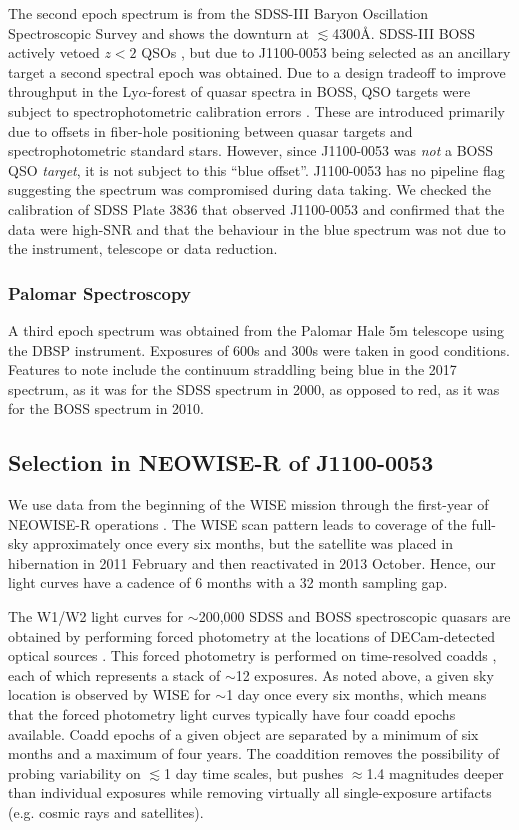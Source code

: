 \documentclass[11pt,a4paper]{article}
\begin{document}
The second epoch spectrum is from the SDSS-III Baryon Oscillation
Spectroscopic Survey \citep[BOSS; ][]{Dawson2013} and shows the
downturn at $\lesssim$4300\AA. SDSS-III BOSS actively vetoed $z<2$
QSOs \citep{Ross2012}, but due to J1100-0053 being selected as an
ancillary target \citep[via a white dwarf program;][]{Kepler2015,
Kepler2016} a second spectral epoch was obtained. Due to a design
tradeoff to improve throughput in the Ly$\alpha$-forest of quasar
spectra in BOSS, QSO targets were subject to spectrophotometric
calibration errors \citep{Margala2016}. These are introduced primarily
due to offsets in fiber-hole positioning between quasar targets and
spectrophotometric standard stars. However, since J1100-0053 was {\it
not} a BOSS QSO {\it target}, it is not subject to this ``blue
offset''. J1100-0053 has no pipeline flag suggesting the spectrum was
compromised during data taking. We checked the calibration of SDSS
Plate 3836 that observed J1100-0053 and confirmed that the data were
high-SNR and that the behaviour in the blue spectrum was not due to
the instrument, telescope or data reduction.


\subsubsection{Palomar Spectroscopy} 
A third epoch spectrum was obtained from the Palomar Hale 5m telescope
using the DBSP instrument.  Exposures of 600s and 300s were taken in
good conditions. Features to note include the continuum straddling
\mgii being blue in the 2017 spectrum, as it was for the SDSS spectrum
in 2000, as opposed to red, as it was for the BOSS spectrum in 2010.


\subsection{Selection in NEOWISE-R of J1100-0053}
We use data from the beginning of the WISE mission \citep[2010
January; ][]{Wright2010} through the first-year of NEOWISE-R
operations \citep[2014 December][]{Mainzer2011}. The WISE scan pattern
leads to coverage of the full-sky approximately once every six months,
but the satellite was placed in hibernation in 2011 February and then
reactivated in 2013 October. Hence, our light curves have a cadence of
6 months with a 32 month sampling gap.

The W1/W2 light curves for $\sim$200,000 SDSS and BOSS spectroscopic
quasars are obtained by performing forced photometry at the locations
of DECam-detected optical sources \citep{Lang2014, Meisner2017a,
Meisner2017b}. This forced photometry is performed on time-resolved
coadds \citep{Lang2014}, each of which represents a stack of $\sim$12
exposures. As noted above, a given sky location is observed by WISE
for $\sim$1 day once every six months, which means that the forced
photometry light curves typically have four coadd epochs
available. Coadd epochs of a given object are separated by a minimum
of six months and a maximum of four years. The coaddition removes the
possibility of probing variability on $\lesssim$1 day time scales, but
pushes $\approx$1.4 magnitudes deeper than individual exposures while
removing virtually all single-exposure artifacts (e.g. cosmic rays and
satellites).
\end{document}
